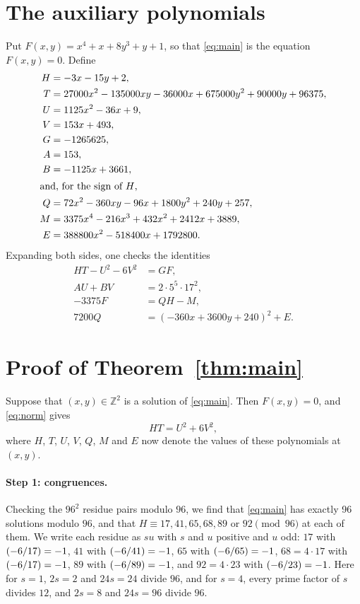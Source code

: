 \documentclass[11pt]{article}
\newcommand{\Z}{\mathbb{Z}}
\newcommand{\leg}[2]{\mathchoice{\biggl(\dfrac{#1}{#2}\biggr)}{(#1/#2)}{(#1/#2)}{(#1/#2)}}
\begin{document}
\section{The auxiliary polynomials}

Put $F(x,y)=x^{4}+x+8y^{3}+y+1$, so that \eqref{eq:main} is the equation $F(x,y)=0$. Define
\begin{align*}
H&=-3x-15y+2,\\
T&=27000x^{2}-135000xy-36000x+675000y^{2}+90000y+96375,\\
U&=1125x^{2}-36x+9,\\
V&=153x+493,\\
G&=-1265625,\\
A&=153,\\
B&=-1125x+3661,\\
\intertext{and, for the sign of $H$,}
Q&=72x^{2}-360xy-96x+1800y^{2}+240y+257,\\
M&=3375x^{4}-216x^{3}+432x^{2}+2412x+3889,\\
E&=388800x^{2}-518400x+1792800.
\end{align*}
Expanding both sides, one checks the identities
\begin{align}
HT-U^2-6V^2&=GF,\label{eq:norm}\\
AU+BV&=2\cdot 5^{5}\cdot 17^{2},\label{eq:bezout}\\
-3375F&=QH-M,\label{eq:sign}\\
7200Q&=(-360x+3600y+240)^2+E.\label{eq:sign2}
\end{align}

\section{Proof of Theorem~\ref{thm:main}}

Suppose that $(x,y)\in\Z^2$ is a solution of \eqref{eq:main}. Then $F(x,y)=0$, and \eqref{eq:norm} gives
\begin{equation}\label{eq:HT}
HT=U^2+6V^2,
\end{equation}
where $H$, $T$, $U$, $V$, $Q$, $M$ and $E$ now denote the values of these polynomials at $(x,y)$.

\paragraph{Step 1: congruences.} Checking the $96^2$ residue pairs modulo $96$, we find that \eqref{eq:main} has exactly 96 solutions modulo $96$, and that $H\equiv17,\allowbreak 41,\allowbreak 65,\allowbreak 68,\allowbreak 89\text{ or }92\pmod{96}$ at each of them. We write each residue as $su$ with $s$ and $u$ positive and $u$ odd: $17$ with $\leg{-6}{17}=-1$, $41$ with $\leg{-6}{41}=-1$, $65$ with $\leg{-6}{65}=-1$, $68=4\cdot17$ with $\leg{-6}{17}=-1$, $89$ with $\leg{-6}{89}=-1$, and $92=4\cdot23$ with $\leg{-6}{23}=-1$. Here for $s=1$, $2s=2$ and $24s=24$ divide $96$, and for $s=4$, every prime factor of $s$ divides $12$, and $2s=8$ and $24s=96$ divide $96$.
\end{document}
